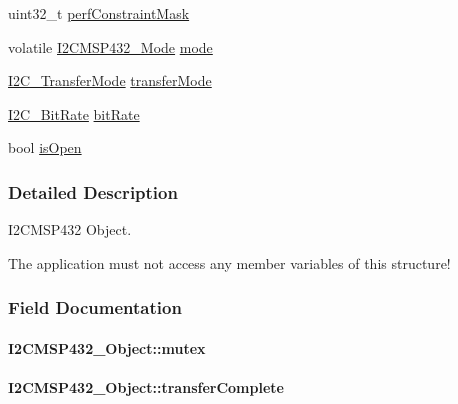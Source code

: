 \begin{DoxyCompactItemize}
\item 
uint32\+\_\+t \hyperlink{struct_i2_c_m_s_p432___object_a4cd3d4755b446fa86b27e33e6f5a314d}{perf\+Constraint\+Mask}
\item 
volatile \hyperlink{_i2_c_m_s_p432_8h_aec46b533f0842a3ce99decddeaaadd74}{I2\+C\+M\+S\+P432\+\_\+\+Mode} \hyperlink{struct_i2_c_m_s_p432___object_ace0781ff5ec5158b40ed48b52c7363aa}{mode}
\item 
\hyperlink{_i2_c_8h_a39f3b9340fc4ee241b0d2da9b2841c26}{I2\+C\+\_\+\+Transfer\+Mode} \hyperlink{struct_i2_c_m_s_p432___object_a63238b519253fec35486056ab02993b7}{transfer\+Mode}
\item 
\hyperlink{_i2_c_8h_ac954e3197f04c50293db466c4abb6fbe}{I2\+C\+\_\+\+Bit\+Rate} \hyperlink{struct_i2_c_m_s_p432___object_a8cfd2339e497646a638c2896076b5857}{bit\+Rate}
\item 
bool \hyperlink{struct_i2_c_m_s_p432___object_a843285f771e87015e5a101b8e77a9463}{is\+Open}
\end{DoxyCompactItemize}


\subsubsection{Detailed Description}
I2\+C\+M\+S\+P432 Object. 

The application must not access any member variables of this structure! 

\subsubsection{Field Documentation}
\paragraph[{mutex}]{ I2\+C\+M\+S\+P432\+\_\+\+Object\+::mutex}\label{struct_i2_c_m_s_p432___object_a5e99e2c1d15b5c1526f3db7b914bdcaa}
\paragraph[{transfer\+Complete}]{ I2\+C\+M\+S\+P432\+\_\+\+Object\+::transfer\+Complete}\label{struct_i2_c_m_s_p432___object_aa0ae465ee677d9969407f5f53651ad2e}
